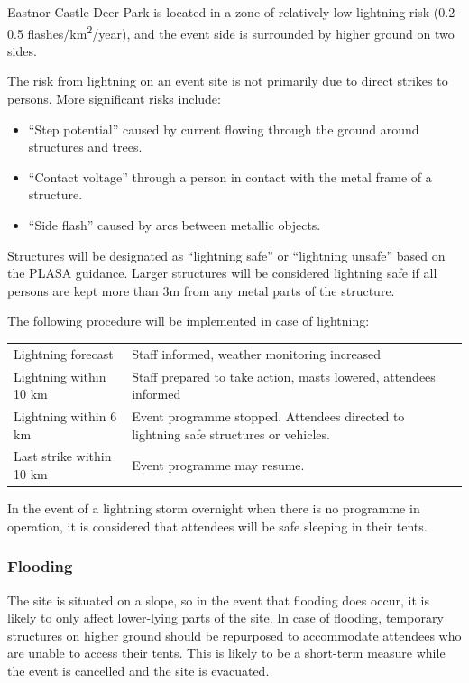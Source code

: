 Eastnor Castle Deer Park is located in a zone of relatively low lightning risk (0.2-0.5
flashes/km\textsuperscript{2}/year\cite{pd62305-2}), and the event side is surrounded by
higher ground on two sides.

The risk from lightning on an event site is not primarily due to direct strikes to persons.
More significant risks include:

\begin{itemize}
    \tightlist
    \item ``Step potential'' caused by current flowing through the ground around structures and trees.
    \item ``Contact voltage'' through a person in contact with the metal frame of a structure.
    \item ``Side flash'' caused by arcs between metallic objects.
\end{itemize}

Structures will be designated as ``lightning safe'' or ``lightning unsafe'' based on the PLASA guidance.
Larger structures will be considered lightning safe if all persons are kept more than 3m from any metal
parts of the structure.

The following procedure will be implemented in case of lightning:

\begin{tabular}{| l | l |}
    \hline
    Lightning forecast       & Staff informed, weather monitoring increased                                          \\
    Lightning within 10 km   & Staff prepared to take action, masts lowered, attendees informed                      \\
    Lightning within 6 km    & Event programme stopped. Attendees directed to lightning safe structures or vehicles. \\
    Last strike within 10 km & Event programme may resume.                                                           \\
    \hline
\end{tabular}

In the event of a lightning storm overnight when there is no programme in operation, it is considered that
attendees will be safe sleeping in their tents.

\subsubsection{Flooding}

The site is situated on a slope, so in the event that flooding does occur, it is likely to
only affect lower-lying parts of the site. In case of flooding, temporary structures on higher
ground should be repurposed to accommodate attendees who are unable to access their tents. This
is likely to be a short-term measure while the event is cancelled and the site is evacuated.

